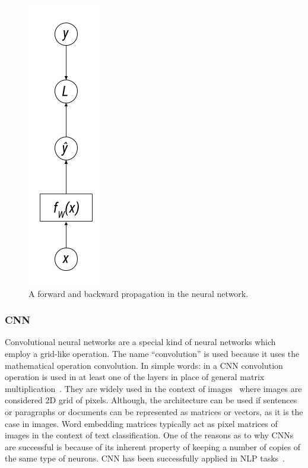 \begin{figure}
    \centering
    \includegraphics[scale=0.5]{Figures/back-propagation.png}
    \caption{A forward and backward propagation in the neural network.}
    \label{fig:oneepoch}
\end{figure}


\subsubsection{CNN}\label{sec:cnn}
Convolutional neural networks are a special kind of neural networks which employ a grid-like operation. The name ``convolution'' is used because it uses the mathematical operation convolution. In simple words: in a CNN convolution operation is used in at least one of the layers in place of general matrix multiplication~\cite{Goodfellow-et-al-2016}.
They are widely used in the context of images~\cite{krizhevsky2012imagenet} where images are considered 2D grid of pixels. Although, the architecture can be used if sentences or paragraphs or documents can be represented as matrices or vectors, as it is the case in images. Word embedding matrices typically act as pixel matrices of images in the context of text classification. One of the reasons as to why CNNs are successful is because of its inherent property of keeping a number of copies of the same type of neurons. 
CNN has been successfully applied in NLP tasks~\cite{dos2014deep, zeng2014relation}. 

